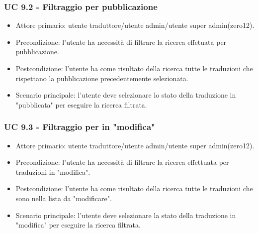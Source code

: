     \subsubsection{UC 9.2 - Filtraggio per pubblicazione}
        \begin{itemize}
            \item Attore primario: utente traduttore/utente admin/utente super admin(zero12).
            \item Precondizione: l'utente ha necessità di filtrare la ricerca effetuata per pubblicazione.
            \item Postcondizione: l'utente ha come risultato della ricerca tutte le traduzioni che rispettano la pubblicazione precedentemente selezionata. 
            \item Scenario principale: l'utente deve selezionare lo stato della traduzione in "pubblicata" per eseguire la ricerca filtrata.
        \end{itemize}
    \subsubsection{UC 9.3 - Filtraggio per in "modifica"}
        \begin{itemize}
            \item Attore primario: utente traduttore/utente admin/utente super admin(zero12).
            \item Precondizione: l'utente ha necessità di filtrare la ricerca effettuata per traduzioni in "modifica".
            \item Postcondizione: l'utente ha come risultato della ricerca tutte le traduzioni che sono nella lista da "modificare". 
            \item Scenario principale: l'utente deve selezionare la stato della traduzione in "modifica" per eseguire la ricerca filtrata.
        \end{itemize}
